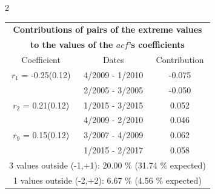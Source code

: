 
\thispagestyle{empty}
\begin{multicols}{2}{ 
\begin{tabular}{ccc}
\multicolumn{3}{c}{\textbf{Contributions of pairs of the extreme values} }  \vspace{-.10in}  \\ 
\multicolumn{3}{c}{ \textbf{to the values of the $acf$'s coefficients}} \\ 
\hline 
\hline                  Coefficient  &  Dates &  Contribution \\ 
\hline 
  $r_{ 1}$ = -0.25(0.12) &       4/2009 -  1/2010 &       -0.075    \vspace{-.10in} \\ 
  &        2/2005 -  3/2005 &       -0.050  \vspace{-.02in}   \\ \hline 
    $r_{ 2}$ = 0.21(0.12) &       1/2015 -  3/2015 &        0.052   \vspace{-.10in} \\  
&        4/2009 -  2/2010 &        0.046  \vspace{-.02in} \\ \hline 
  $r_{ 9}$ = 0.15(0.12) &       3/2007 -  4/2009 &        0.062   \vspace{-.10in} \\  
&        1/2015 -  2/2017 &        0.058  \vspace{-.02in} \\ \hline 
\multicolumn{3}{c}{               3 values outside (-1,+1): 20.00  \% (31.74  \% expected)}\vspace{-.10in} \\ 
\multicolumn{3}{c}{               1 values outside (-2,+2):  6.67 \%  (4.56 \% expected) } \\
 \end{tabular} \\ 
 } 
\end{multicols} 
